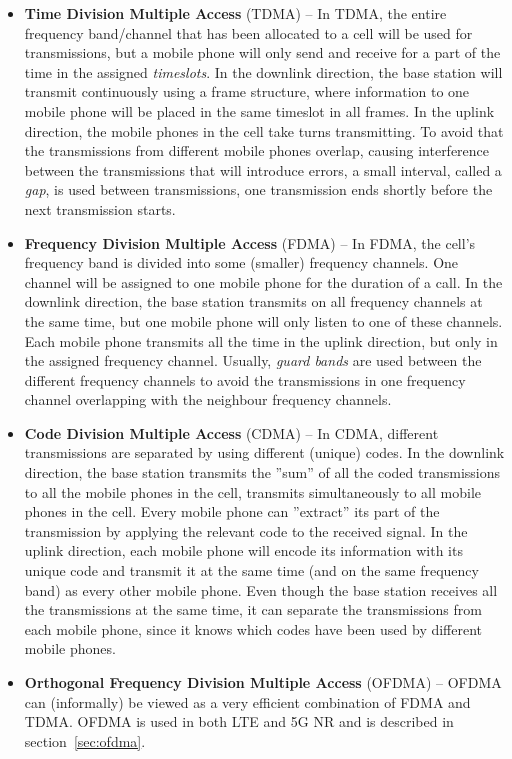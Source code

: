 \begin{itemize}
\item \textbf{Time Division Multiple Access} (TDMA) -- In TDMA, the entire frequency band/channel that has been allocated to a cell will be used for transmissions, but a mobile phone will only send and receive for a part of the time in the assigned \emph{timeslots}. In the downlink direction, the base station will transmit continuously using a frame structure, where information to one mobile phone will be placed in the same timeslot in all frames. In the uplink direction, the mobile phones in the cell take turns transmitting. To avoid that the transmissions from different mobile phones overlap, causing interference between the transmissions that will introduce errors, a small interval, called a \emph{gap}, is used between transmissions, \ie one transmission ends shortly before the next transmission starts.
%
\item \textbf{Frequency Division Multiple Access} (FDMA) -- In FDMA, the cell's frequency band is divided into some (smaller) frequency channels. One channel will be assigned to one mobile phone for the duration of a call. In the downlink direction, the base station transmits on all frequency channels at the same time, but one mobile phone will only listen to one of these channels. Each mobile phone transmits all the time in the uplink direction, but only in the assigned frequency channel. Usually, \emph{guard bands} are used between the different frequency channels to avoid the transmissions in one frequency channel overlapping with the neighbour frequency channels.
%
\item \textbf{Code Division Multiple Access} (CDMA) -- In CDMA, different transmissions are separated by using different (unique) codes. In the downlink direction, the base station transmits the ''sum'' of all the coded transmissions to all the mobile phones in the cell, \ie transmits simultaneously to all mobile phones in the cell. Every mobile phone can ''extract'' its part of the transmission by applying the relevant code to the received signal. In the uplink direction, each mobile phone will encode its information with its unique code and transmit it at the same time (and on the same frequency band) as every other mobile phone. Even though the base station receives all the transmissions at the same time, it can separate the transmissions from each mobile phone, since it knows which codes have been used by different mobile phones.
%
\item \textbf{Orthogonal Frequency Division Multiple Access} (OFDMA) -- OFDMA can (informally) be viewed as a very efficient combination of FDMA and TDMA. OFDMA is used in both LTE and 5G NR and is described in section~\ref{sec:ofdma}.

\end{itemize}
